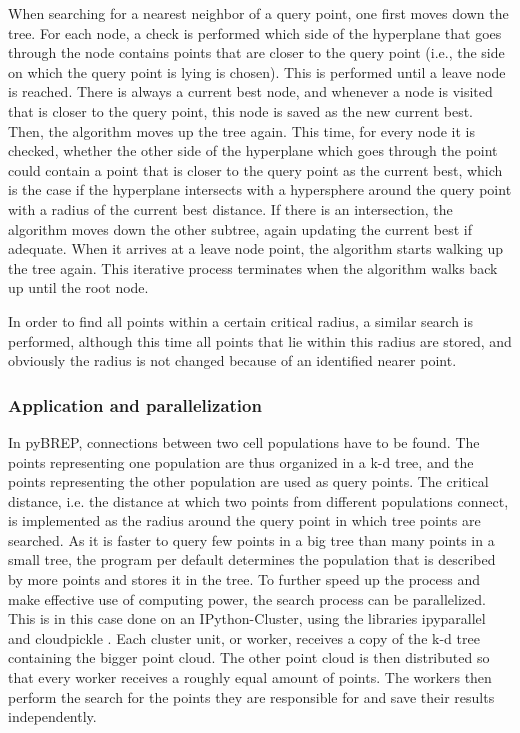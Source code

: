 \documentclass[12pt]{report}
\begin{document}
When searching for a nearest neighbor of a query point, one first moves down the tree. For each node, a check is performed which side of the hyperplane that goes through the node contains points that are closer to the query point (i.e., the side on which the query point is lying is chosen). This is performed until a leave node is reached. There is always a current best node, and whenever a node is visited that is closer to the query point, this node is saved as the new current best. Then, the algorithm moves up the tree again. This time, for every node it is checked, whether the other side of the hyperplane which goes through the point could contain a point that is closer to the query point as the current best, which is the case if the hyperplane intersects with a hypersphere around the query point with a radius of the current best distance. If there is an intersection, the algorithm moves down the other subtree, again updating the current best if adequate. When it arrives at a leave node point, the algorithm starts walking up the tree again. This iterative process terminates when the algorithm walks back up until the root node. 

In order to find all points within a certain critical radius, a similar search is performed, although this time all points that lie within this radius are stored, and obviously the radius is not changed because of an identified nearer point.


\subsubsection{Application and parallelization}
In pyBREP, connections between two cell populations have to be found. The points representing one population are thus organized in a k-d tree, and the points representing the other population are used as query points. The critical distance, i.e. the distance at which two points from different populations connect, is implemented as the radius around the query point in which tree points are searched. As it is faster to query few points in a big tree than many points in a small tree, the program per default determines the population that is described by more points and stores it in the tree.
To further speed up the process and make effective use of computing power, the search process can be parallelized. This is in this case done on an IPython-Cluster, using the libraries ipyparallel \cite{r:ipp} and cloudpickle \cite{r:cloudpickle}. Each cluster unit, or worker, receives a copy of the k-d tree containing the bigger point cloud. The other point cloud is then distributed so that every worker receives a roughly equal amount of points. The workers then perform the search for the points they are responsible for and save their results independently.
\end{document}
